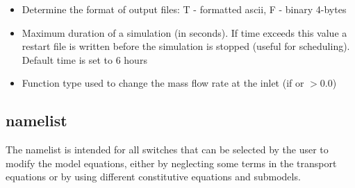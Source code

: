 \begin{itemize}
\item
{}
{Determine the format of output files: T - formatted ascii, 
F - binary 4-bytes }

\item
{}
{Maximum duration of a simulation (in seconds). If time exceeds this value
a restart file is written before the simulation is stopped (useful for
scheduling). Default time is set to 6 hours}

\item
{}
{Function type used to change the mass flow rate at the inlet (if  
or  $> 0.0$)}
\end{itemize}

\subsection{ namelist}
The  namelist is intended for all switches that can be selected
by the user to modify the model equations, either by neglecting some terms
in the transport equations or by using different constitutive equations
and submodels.

